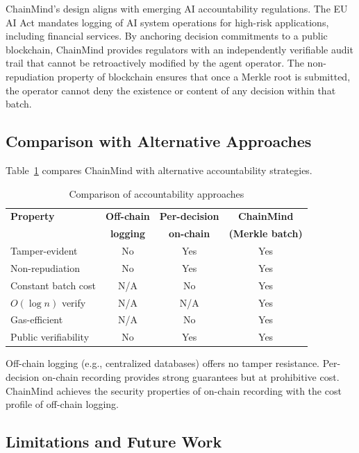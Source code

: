 \documentclass[manuscript,nonacm]{acmart}
\begin{document}
ChainMind's design aligns with emerging AI accountability regulations. The EU AI Act mandates logging of AI system operations for high-risk applications, including financial services. By anchoring decision commitments to a public blockchain, ChainMind provides regulators with an independently verifiable audit trail that cannot be retroactively modified by the agent operator. The non-repudiation property of blockchain ensures that once a Merkle root is submitted, the operator cannot deny the existence or content of any decision within that batch.

\subsection{Comparison with Alternative Approaches}

Table~\ref{tab:comparison} compares ChainMind with alternative accountability strategies.

\begin{table}[h]
\centering
\caption{Comparison of accountability approaches}
\label{tab:comparison}
\begin{tabular}{@{}lccc@{}}
\toprule
\textbf{Property} & \textbf{Off-chain} & \textbf{Per-decision} & \textbf{ChainMind} \\
 & \textbf{logging} & \textbf{on-chain} & \textbf{(Merkle batch)} \\
\midrule
Tamper-evident      & No  & Yes & Yes \\
Non-repudiation     & No  & Yes & Yes \\
Constant batch cost & N/A & No  & Yes \\
$O(\log n)$ verify  & N/A & N/A & Yes \\
Gas-efficient       & N/A & No  & Yes \\
Public verifiability & No & Yes & Yes \\
\bottomrule
\end{tabular}
\end{table}

Off-chain logging (e.g., centralized databases) offers no tamper resistance. Per-decision on-chain recording provides strong guarantees but at prohibitive cost. ChainMind achieves the security properties of on-chain recording with the cost profile of off-chain logging.

\subsection{Limitations and Future Work}
\end{document}
